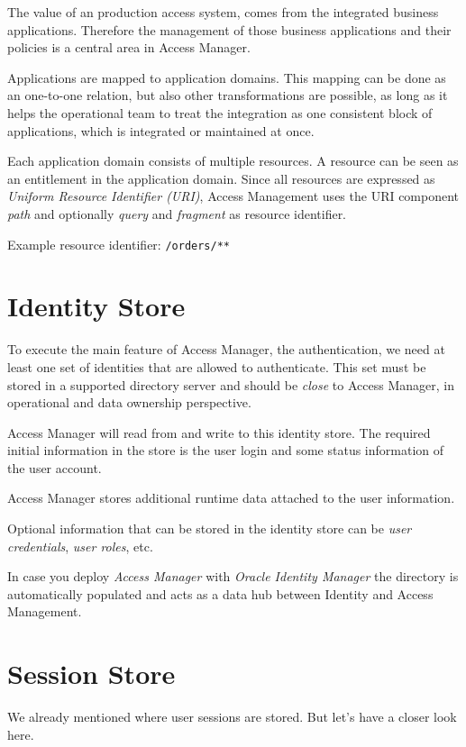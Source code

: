 \documentclass[11pt]{report}
\begin{document}
The value of an production access system, comes from the integrated
business applications. Therefore the management of those business
applications and their policies is a central area in Access Manager.

Applications are mapped to application domains. This mapping can be done  
as an one-to-one relation, but also other transformations are possible,
as long as it helps the operational team to treat the integration as one
consistent block of applications, which is integrated or maintained at
once.

Each application domain consists of multiple resources. A resource can
be seen as an entitlement in the application domain. Since all resources
are expressed as \emph{Uniform Resource Identifier (URI)}, Access
Management uses the URI component \emph{path} and optionally \emph{query} and
\emph{fragment} as resource identifier.

Example resource identifier: \verb|/orders/**|



\section{Identity Store}

To execute the main feature of Access Manager, the authentication, we
need at least one set of identities that are allowed to authenticate.
This set must be stored in a supported directory server and should be
\emph{close} to Access Manager, in operational and data ownership
perspective.

Access Manager will read from and write to this identity store. The
required initial information in the store is the user login and some
status information of the user account.

Access Manager stores additional runtime data attached to the user
information.

Optional information that can be stored in the identity store can be
\emph{user credentials}, \emph{user roles}, etc.

In case you deploy \emph{Access Manager} with \emph{Oracle Identity
Manager} the directory is automatically populated and acts as a data hub
between Identity and Access Management.


\section{Session Store}

We already mentioned where user sessions are stored. But let's have a
closer look here.
\end{document}
